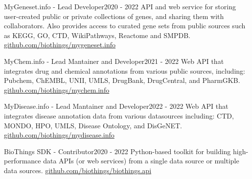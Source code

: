 %
%
%


\begin{projects}
	\project
	{MyGeneset.info - Lead Developer}{2020 - 2022}
	{API and web service for storing user-created public or private collections of genes, and sharing them with collaborators. Also provides access to curated gene sets from public sources such as KEGG, GO, CTD, WikiPathways, Reactome and SMPDB.}
	{\href{https://github.com/biothings/mygeneset.info}{github.com/biothings/mygeneset.info}}

	\project
	{MyChem.info - Lead Mantainer and Developer}{2021 - 2022}
	{Web API that integrates drug and chemical annotations from various public sources, including: Pubchem, ChEMBL, UNII, UMLS, DrugBank, DrugCentral, and PharmGKB.}
	{\href{https://github.com/biothings/mychem.info}{github.com/biothings/mychem.info}}

	\project
	{MyDisease.info - Lead Mantainer and Developer}{2022 - 2022}
	{Web API that integrates disease annotation data from various datasources including: CTD, MONDO, HPO, UMLS, Disease Ontology, and DisGeNET.}
	{\href{https://github.com/biothings/mydisease.info}{github.com/biothings/mydisease.info}}

	\project
	{BioThings SDK - Contributor}{2020 - 2022}
	{Python-based toolkit for building high-performance data APIs (or web services) from a single data source or multiple data sources.}
	{\href{https://github.com/biothings/biothings.api}{github.com/biothings/biothings.api}}
\end{projects}